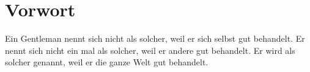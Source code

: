 \chapter*{Vorwort}



 Ein Gentleman nennt sich nicht als solcher, weil er sich selbst gut behandelt.
 Er nennt sich nicht ein mal als solcher, weil  er andere gut behandelt.
 Er wird als solcher genannt, weil er die ganze Welt gut behandelt.\\ \\

